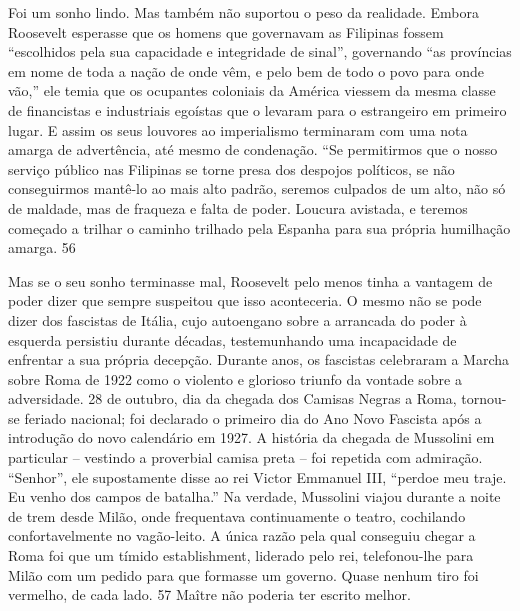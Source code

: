  
\par
 
Foi um sonho lindo. Mas também não suportou o peso da realidade. Embora Roosevelt esperasse que os homens que governavam as Filipinas fossem “escolhidos pela sua capacidade e integridade de sinal”, governando “as províncias em nome de toda a nação de onde vêm, e pelo bem de todo o povo para onde vão,” ele temia que os ocupantes coloniais da América viessem da mesma classe de financistas e industriais egoístas que o levaram para o estrangeiro em primeiro lugar. E assim os seus louvores ao imperialismo terminaram com uma nota amarga de advertência, até mesmo de condenação. “Se permitirmos que o nosso serviço público nas Filipinas se torne presa dos despojos políticos, se não conseguirmos mantê-lo ao mais alto padrão, seremos culpados de um alto, não só de maldade, mas de fraqueza e falta de poder. Loucura avistada, e teremos começado a trilhar o caminho trilhado pela Espanha para sua própria humilhação amarga.
 {\color{blue} 56}  

 
\par
 
Mas se o seu sonho terminasse mal, Roosevelt pelo menos tinha a vantagem de poder dizer que sempre suspeitou que isso aconteceria. O mesmo não se pode dizer dos fascistas de Itália, cujo autoengano sobre a arrancada do poder à esquerda persistiu durante décadas, testemunhando uma incapacidade de enfrentar a sua própria decepção. Durante anos, os fascistas celebraram a Marcha sobre Roma de 1922 como o violento e glorioso triunfo da vontade sobre a adversidade. 28 de outubro, dia da chegada dos Camisas Negras a Roma, tornou-se feriado nacional; foi declarado o primeiro dia do Ano Novo Fascista após a introdução do novo calendário em 1927. A história da chegada de Mussolini em particular – vestindo a proverbial camisa preta – foi repetida com admiração. “Senhor”, ele supostamente disse ao rei Victor Emmanuel III, “perdoe meu traje. Eu venho dos campos de batalha.” Na verdade, Mussolini viajou durante a noite de trem desde Milão, onde frequentava continuamente o teatro, cochilando confortavelmente no vagão-leito. A única razão pela qual conseguiu chegar a Roma foi que um tímido establishment, liderado pelo rei, telefonou-lhe para Milão com um pedido para que formasse um governo. Quase nenhum tiro foi vermelho, de cada lado.
 {\color{blue} 57}  
Maître não poderia ter escrito melhor.
 
\par
 
